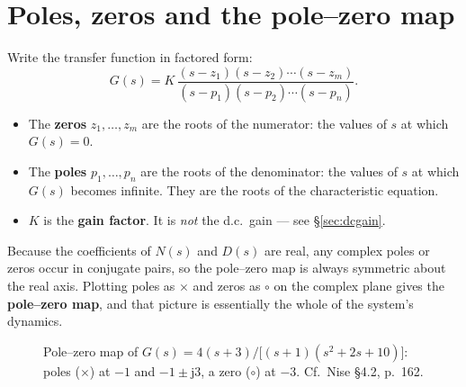 \documentclass[11pt,a4paper]{article}
\begin{document}
\section{Poles, zeros and the pole--zero map}
\label{sec:polezero}

Write the transfer function in factored form:
\begin{equation}
  G(s) = K\,\frac{(s-z_1)(s-z_2)\cdots(s-z_m)}{(s-p_1)(s-p_2)\cdots(s-p_n)} .
  \label{eq:factored}
\end{equation}

\begin{itemize}[leftmargin=*]
\item The \textbf{zeros} $z_1,\dots,z_m$ are the roots of the numerator: the
      values of $s$ at which $G(s)=0$.
\item The \textbf{poles} $p_1,\dots,p_n$ are the roots of the denominator: the
      values of $s$ at which $G(s)$ becomes infinite. They are the roots of the
      characteristic equation.
\item $K$ is the \textbf{gain factor}. It is \emph{not} the d.c.\ gain ---
      see \S\ref{sec:dcgain}.
\end{itemize}

Because the coefficients of $N(s)$ and $D(s)$ are real, any complex poles or
zeros occur in conjugate pairs, so the pole--zero map is always symmetric about
the real axis. Plotting poles as $\times$ and zeros as $\circ$ on the complex
plane gives the \textbf{pole--zero map}, and that picture is essentially the
whole of the system's dynamics.

\begin{figure}[htbp]
\centering
{}
\caption{Pole--zero map of
$G(s)=4(s+3)/\bigl[(s+1)(s^{2}+2s+10)\bigr]$: poles ($\times$) at $-1$ and
$-1\pm\mathrm{j}3$, a zero ($\circ$) at $-3$. Cf.\ Nise \S4.2, p.~162.}
\label{fig:pzmap}
\end{figure}
\end{document}
